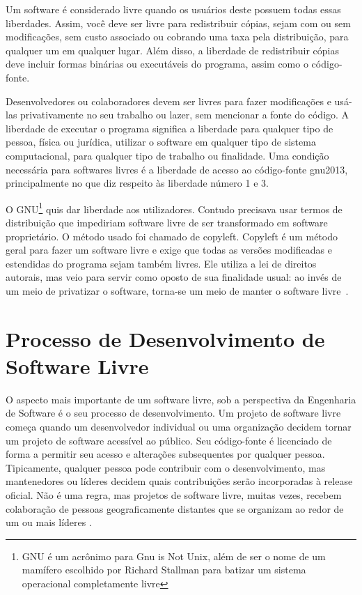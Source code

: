 Um software é considerado livre quando os usuários deste possuem todas essas liberdades. Assim, você deve ser livre para redistribuir cópias, sejam com ou sem modificações, sem custo associado ou cobrando uma taxa pela distribuição, para qualquer um em qualquer lugar. Além disso, a liberdade de redistribuir cópias deve incluir formas binárias ou executáveis do programa, assim como o código-fonte.

Desenvolvedores ou colaboradores devem ser livres para fazer modificações e usá-las privativamente no seu trabalho ou lazer, sem mencionar a fonte do código. A liberdade de executar o programa significa a liberdade para qualquer tipo de pessoa, física ou jurídica, utilizar o software em qualquer tipo de sistema computacional, para qualquer tipo de trabalho ou finalidade. Uma condição necessária para softwares livres é a liberdade de acesso ao código-fonte {gnu2013}, principalmente no que diz respeito às liberdade número 1 e 3.


%
O GNU\footnote{GNU é um acrônimo para Gnu is Not Unix, além de ser o nome de um mamífero escolhido por Richard Stallman para batizar um sistema operacional completamente livre} quis dar liberdade aos utilizadores. Contudo precisava usar termos de distribuição que impediriam software livre de ser transformado em software proprietário. O método usado foi chamado de copyleft. Copyleft é um método geral para fazer um software livre e exige que todas as versões modificadas e estendidas do programa sejam também livres. Ele utiliza a lei de direitos autorais, mas veio para servir como oposto de sua finalidade usual: ao invés de um meio de privatizar o software, torna-se um meio de manter o software livre~\cite{stallman2009}.

\section{Processo de Desenvolvimento de Software Livre}
\label{sec-proc-sl}

O aspecto mais importante de um software livre, sob a perspectiva da Engenharia de Software é o seu processo de desenvolvimento. Um projeto de software livre começa quando um desenvolvedor individual ou uma organização decidem tornar um projeto de software acessível ao público. Seu código-fonte é licenciado de forma a permitir seu acesso e alterações subsequentes por qualquer pessoa. Tipicamente, qualquer pessoa pode contribuir com o desenvolvimento, mas mantenedores ou líderes decidem quais contribuições serão incorporadas à release oficial. Não é uma regra, mas projetos de software livre, muitas vezes, recebem colaboração de pessoas geograficamente distantes que se organizam ao redor de um ou mais líderes \cite{corbucci2011freemethods}. 

